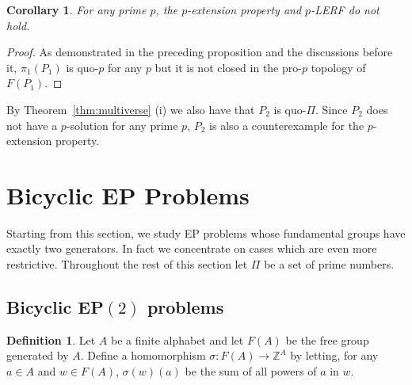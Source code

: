 \documentclass[10pt,a4paper]{amsart}
\newtheorem{corollary}[theorem]{Corollary}
\theoremstyle{definition}
\newtheorem{definition}[theorem]{Definition}
\theoremstyle{definition}
\numberwithin{equation}{section}
\begin{document}
\begin{corollary} For any prime $p$, the $p$-extension property and $p$-LERF do not hold.
\end{corollary}

\begin{proof} As demonstrated in the preceding proposition and the discussions before it, $\pi_1(P_1)$ is quo-$p$ for any $p$ but it is not closed in the pro-$p$ topology of $F(P_1)$. 
\end{proof}

By Theorem~\ref{thm:multiverse} (i) we also have that $P_2$ is quo-$\Pi$. Since $P_2$ does not have a $p$-solution for any prime $p$, $P_2$ is also a counterexample for the $p$-extension property.






































\section{Bicyclic EP Problems}

Starting from this section, we study EP problems whose fundamental groups have exactly two generators. In fact we concentrate on cases which are even more restrictive. Throughout the rest of this section let $\Pi$ be a set of prime numbers.



\subsection{Bicyclic EP$(2)$ problems} 

\begin{definition} Let $A$ be a finite alphabet and let $F(A)$ be the free group generated by $A$. Define a homomorphism $\sigma\colon F(A)\to \mathbb{Z}^A$ by letting, for any $a\in A$ and $w\in F(A)$, $\sigma(w)(a)$ be the sum of all powers of $a$ in $w$. 
\end{definition}
\end{document}
